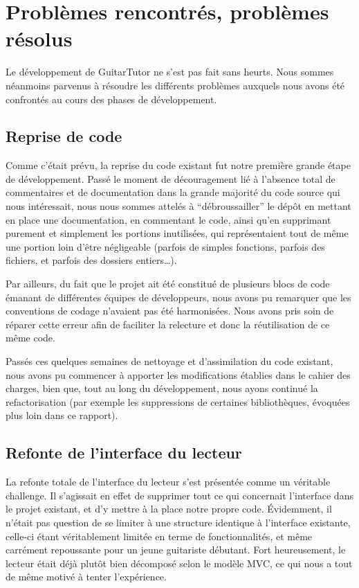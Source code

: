 \documentclass[a4paper,11pt]{article}
\begin{document}
\section{Problèmes rencontrés, problèmes résolus}

Le développement de GuitarTutor ne s'est pas fait sans heurts. Nous sommes néanmoins parvenus à résoudre les différents problèmes auxquels nous avons été confrontés au cours des phases de développement.

\subsection{Reprise de code}

Comme c'était prévu, la reprise du code existant fut notre première grande étape de développement. Passé le moment de découragement lié à l'absence total de commentaires et de documentation dans la grande majorité du code source qui nous intéressait, nous nous sommes attelés à ``débroussailler'' le dépôt en mettant en place une documentation, en commentant le code, ainsi qu'en supprimant purement et simplement les portions inutilisées, qui représentaient tout de même une portion loin d'être négligeable (parfois de simples fonctions, parfois des fichiers, et parfois des dossiers entiers\dots).

Par ailleurs, du fait que le projet ait été constitué de plusieurs blocs de code émanant de différentes équipes de développeurs, nous avons pu remarquer que les conventions de codage n'avaient pas été harmonisées. Nous avons pris soin de réparer cette erreur afin de faciliter la relecture et donc la réutilisation de ce même code.

Passés ces quelques semaines de nettoyage et d'assimilation du code existant, nous avons pu commencer à apporter les modifications établies dans le cahier des charges, bien que, tout au long du développement, nous ayons continué la refactorisation (par exemple les suppressions de certaines bibliothèques, évoquées plus loin dans ce rapport).

\subsection{Refonte de l'interface du lecteur}

La refonte totale de l'interface du lecteur s'est présentée comme un véritable challenge. Il s'agissait en effet de supprimer tout ce qui concernait l'interface dans le projet existant, et d'y mettre à la place notre propre code. Évidemment, il n'était pas question de se limiter à une structure identique à l'interface existante, celle-ci étant véritablement limitée en terme de fonctionnalités, et m\^eme carrément repoussante pour un jeune guitariste débutant. Fort heureusement, le lecteur était déjà plut\^ot bien décomposé selon le modèle MVC, ce qui nous a tout de m\^eme motivé à tenter l'expérience.
\end{document}
